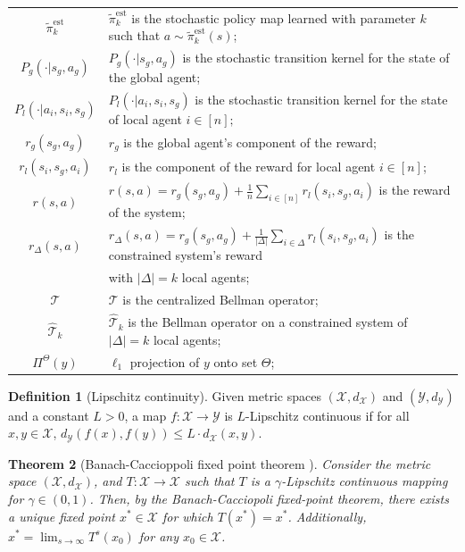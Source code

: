 \documentclass{article}
\theoremstyle{plain}
\newtheorem{theorem}{Theorem}[section]
\theoremstyle{definition}
\newtheorem{definition}[theorem]{Definition}
\def\est{\mathrm{est}}
\begin{document}
\begin{table}[hbt!]
\begin{tabular}{c|l}
    $\tilde{\pi}^\est_k$ & $\tilde{\pi}^\est_k$ is the stochastic policy map learned with parameter $k$ such that $a\sim\tilde{\pi}_k^\est(s)$;\\ 
    $P_g(\cdot|s_g,a_g)$ & $P_g(\cdot|s_g,a_g)$ is the stochastic transition kernel for the state of the global agent; \\ 
    $P_l(\cdot|a_i,s_i,s_g)$ & $P_l(\cdot|a_i,s_i,s_g)$ is the stochastic transition kernel for the state of local agent $i\in[n];$\\  
    $r_g(s_g,a_g)$ & $r_g$ is the global agent's component of the reward;\\
    $r_l(s_i,s_g,a_i)$ & $r_l$ is the component of the reward for local agent $i\in[n]$;\\
    $r(s,a)$ & $r(s,a) = r_g(s_g,a_g)+\frac{1}{n}\sum_{i\in[n]}r_l(s_i,s_g,a_i)$ is the reward of the system; \\
    $r_\Delta(s,a)$ & $r_\Delta(s,a) = r_g(s_g,a_g)+\frac{1}{|\Delta|}\sum_{i\in\Delta}r_l(s_i,s_g,a_i)$ is the constrained system's reward\\ &\quad\quad with $|\Delta|=k$ local agents;\\
    $\mathcal{T}$ & $\mathcal{T}$ is the centralized Bellman operator;\\
    $\hat{\mathcal{T}}_k$ & $\hat{\mathcal{T}}_k$ is the Bellman operator on a constrained system of $|\Delta|=k$ local agents;\\
    $\Pi^\Theta(y)$ & $\ell_1$ projection of $y$ onto set $\Theta$;\\
    \hline
  \end{tabular}
\end{table}


\begin{definition}[Lipschitz continuity] Given metric spaces $(\mathcal{X}, d_\mathcal{X})$ and $(\mathcal{Y}, d_\mathcal{Y})$ and a constant $L>0$, a map $f:\mathcal{X}\to \mathcal{Y}$ is $L$-Lipschitz continuous if for all $x,y\in \mathcal{X}$, $
    d_\mathcal{Y}(f(x), f(y)) \leq L \cdot  d_\mathcal{X}(x,y)$.
\end{definition} 

\begin{theorem}[Banach-Caccioppoli fixed point theorem \citep{Banach1922}]
Consider the metric space $(\mathcal{X}, d_\mathcal{X})$, and $T: \mathcal{X}\to \mathcal{X}$ such that $T$ is a $\gamma$-Lipschitz continuous mapping for $\gamma \in (0,1)$. Then, by the Banach-Cacciopoli fixed-point theorem, there exists a unique fixed point $x^* \in \mathcal{X}$ for which $T(x^*) = x^*$. Additionally, $x^* = \lim_{s\to\infty} T^s( x_0)$ for any $x_0 \in \mathcal{X}$.
\end{theorem}
\end{document}
